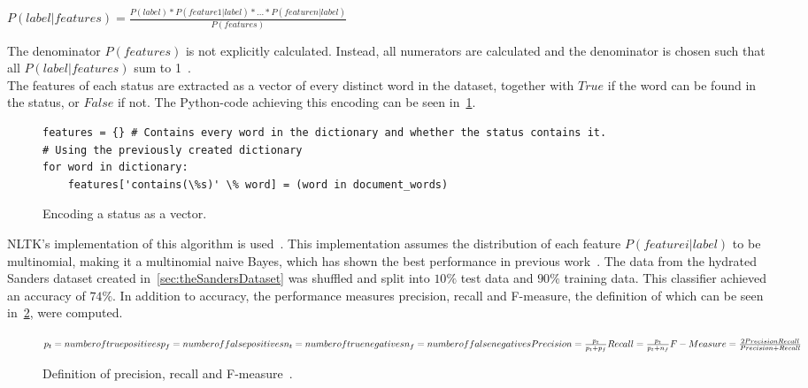 \begin{math}
    P(label|features) = \frac{P(label)*P(feature 1|label)*...*P(feature n|label)}{P(features)}
\end{math}


The denominator $P(features)$ is not explicitly calculated.
Instead, all numerators are calculated and the denominator is chosen such that all $P(label|features)$ sum to 1~\cite{nltkDocs}.
\\
The features of each status are extracted as a vector of every distinct word in the dataset,
together with $True$ if the word can be found in the status, or $False$ if not.
The Python-code achieving this encoding can be seen in~\ref{code:extract_features}.

\begin{figure}
    \caption{Encoding a status as a vector.}
    \label{code:extract_features}
    \begin{verbatim}
features = {} # Contains every word in the dictionary and whether the status contains it.
# Using the previously created dictionary
for word in dictionary:
    features['contains(\%s)' \% word] = (word in document_words)
    \end{verbatim}
\end{figure}

NLTK's implementation of this algorithm is used~\cite{nltkDocs}.
This implementation assumes the distribution of each feature $P(feature i|label)$ to be multinomial,
making it a multinomial naive Bayes, which has shown the best performance in previous work~\cite{Go2009}.
The data from the hydrated Sanders dataset created in~\ref{sec:theSandersDataset} was shuffled and split into $10\%$ test data and $90\%$ training data.
This classifier achieved an accuracy of $74\%$.
In addition to accuracy, the performance measures precision, recall and F-measure,
the definition of which can be seen in~\ref{math:precision_recall_fmeasure}, were computed.

\begin{figure}
    \caption{Definition of precision, recall and F-measure~\cite{Hong2010}.}
    \label{math:precision_recall_fmeasure}
    \begin{math}
        p_t = number of true positives
        p_f = number of false positives
        n_t = number of true negatives
        n_f = number of false negatives
        \\
        Precision = \frac{p_t}{p_t + p_f}
        Recall = \frac{p_t}{p_t + n_f}
        \\
        F-Measure = \frac{2 \* Precision \* Recall}{Precision + Recall}
    \end{math}
\end{figure}


